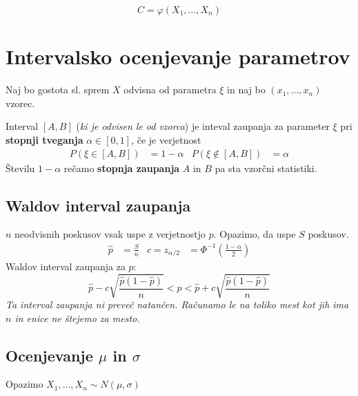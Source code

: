 \begin{multicols}{5}
\[ C = \varphi(X_1, \dots, X_n)\]

\section{Intervalsko ocenjevanje parametrov}
Naj bo gostota sl. sprem $X$ odvisna od parametra $\xi$ in naj bo $(x_1, \dots, x_n)$ vzorec.

Interval $[A, B]$ (\textit{ki je odvisen le od vzorca}) je inteval zaupanja za parameter $\xi$ pri \textbf{stopnji tveganja} $\alpha \in [0,1]$,
če je verjetnost
\begin{align*}
    P(\xi \in [A, B]) &= 1 - \alpha & P(\xi \notin [A, B]) &= \alpha
\end{align*}
Številu $1 - \alpha$ rečamo \textbf{stopnja zaupanja} $A$ in $B$ pa sta vzorčni statistiki.

\subsection{Waldov interval zaupanja}
$n$ neodvisnih poskusov vsak uspe z verjetnostjo $p$. Opazimo, da uspe $S$ poskusov.
\begin{align*}
    \hat{p} &= \frac{S}{n} & c = z_{\alpha/2} &= \Phi^{-1}\left(\frac{1-\alpha}{2}\right)
\end{align*}
Waldov interval zaupanja za $p$:
\[\hat{p} - c\sqrt{\frac{\hat{p}(1-\hat{p})}{n}} < p < \hat{p} + c\sqrt{\frac{\hat{p}(1-\hat{p})}{n}}\]
\textit{Ta interval zaupanja ni preveč natančen. Računamo le na toliko mest kot jih ima $n$ in enice ne štejemo za mesto.}
\subsection{Ocenjevanje $\mu$ in $\sigma$}
Opazimo $X_1, \dots, X_n \sim N(\mu, \sigma)$


\end{multicols}
